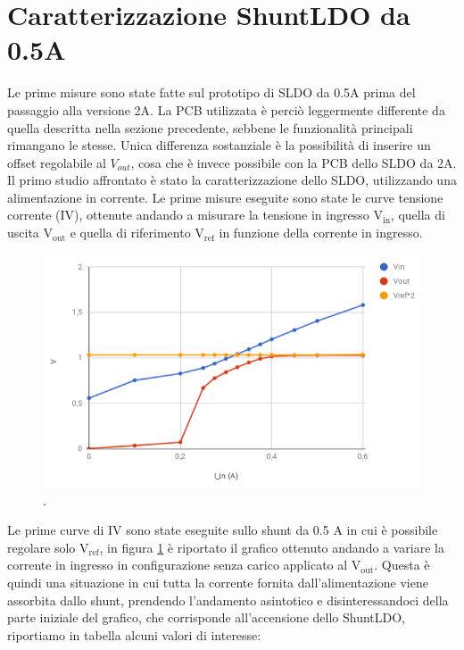 \section{Caratterizzazione ShuntLDO da 0.5A}
Le prime misure sono state fatte sul prototipo di SLDO da 0.5A prima del passaggio alla versione 2A. La PCB utilizzata è perciò leggermente differente da quella descritta nella sezione precedente, sebbene le funzionalità principali rimangano le stesse. Unica differenza sostanziale è la possibilità di inserire un offset regolabile al $V_{out}$, cosa che è invece possibile con la PCB dello SLDO da 2A.
Il primo studio affrontato è stato la caratterizzazione dello SLDO, utilizzando una alimentazione in corrente. Le prime misure eseguite sono state le curve tensione corrente (IV), ottenute andando a misurare la tensione in ingresso $\mathrm{V_{in}}$, quella di uscita $\mathrm{V_{out}}$ e quella di riferimento $\mathrm{V_{ref}}$ in funzione della corrente in ingresso.
\begin{figure}
\centering
\includegraphics[scale=.5]{Immagini/provaSLDO5}
\caption{.}
\label{provaSLDO5}
\end{figure}

Le prime curve di IV sono state eseguite sullo shunt da 0.5 A in cui è possibile regolare solo $\mathrm{V_{ref}}$, in figura \ref{provaSLDO5} è riportato il grafico ottenuto andando a variare la corrente in ingresso in configurazione senza carico applicato al $\mathrm{V_{out}}$. Questa è quindi una situazione in cui tutta la corrente fornita dall'alimentazione viene assorbita dallo shunt,  prendendo l'andamento asintotico e disinteressandoci della parte iniziale del grafico, che corrisponde all'accensione dello ShuntLDO, riportiamo in tabella alcuni valori di interesse: 

